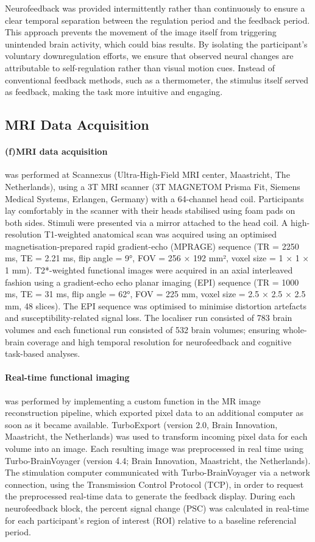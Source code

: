\documentclass[]{imag-ms-template}
\begin{document}
Neurofeedback was provided intermittently rather than continuously to ensure a clear temporal separation between the regulation period and the feedback period. This approach prevents the movement of the image itself from triggering unintended brain activity, which could bias results. By isolating the participant’s voluntary downregulation efforts, we ensure that observed neural changes are attributable to self-regulation rather than visual motion cues. Instead of conventional feedback methods, such as a thermometer, the stimulus itself served as feedback, making the task more intuitive and engaging.

\subsection{MRI Data Acquisition}

\paragraph{(f)MRI data acquisition} was performed at Scannexus (Ultra-High-Field MRI center, Maastricht, The Netherlands), using a 3T MRI scanner (3T MAGNETOM Prisma Fit, Siemens Medical Systems, Erlangen, Germany) with a 64-channel head coil. Participants lay comfortably in the scanner with their heads stabilised using foam pads on both sides. Stimuli were presented via a mirror attached to the head coil.
A high-resolution T1-weighted anatomical scan was acquired using an optimised magnetisation-prepared rapid gradient-echo (MPRAGE) sequence (TR = 2250 ms, TE = 2.21 ms, flip angle = 9°, FOV = 256 × 192 mm², voxel size = 1 × 1 × 1 mm). T2*-weighted functional images were acquired in an axial interleaved fashion using a gradient-echo echo planar imaging (EPI) sequence (TR = 1000 ms, TE = 31 ms, flip angle = 62°, FOV = 225 mm, voxel size = 2.5 × 2.5 × 2.5 mm, 48 slices). The EPI sequence was optimised to minimise distortion artefacts and susceptibility-related signal loss. The localiser run consisted of 783 brain volumes and each functional run consisted of 532 brain volumes; ensuring whole-brain coverage and high temporal resolution for neurofeedback and cognitive task-based analyses.

\paragraph{Real-time functional imaging} was performed by implementing a custom function in the MR image reconstruction pipeline, which exported pixel data to an additional computer as soon as it became available. TurboExport (version 2.0, Brain Innovation, Maastricht, the Netherlands) was used to transform incoming pixel data for each volume into an image. Each resulting image was preprocessed in real time using Turbo-BrainVoyager (version 4.4; Brain Innovation, Maastricht, the Netherlands). The stimulation computer communicated with Turbo-BrainVoyager via a network connection, using the Transmission Control Protocol (TCP), in order to request the preprocessed real-time data to generate the feedback display. During each neurofeedback block, the percent signal change (PSC) was calculated in real-time for each participant's region of interest (ROI) relative to a baseline referencial period.
\end{document}
